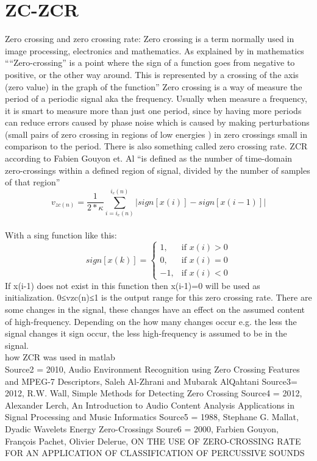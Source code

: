 \section{ZC-ZCR}

Zero crossing and zero crossing rate:
Zero crossing is a term normally used in image processing, electronics and mathematics. As explained by \citep{AlZhrani2010}  in mathematics ““Zero-crossing” is a point where the sign of a function goes from negative to positive, or the other way around. This is represented by a crossing of the axis (zero value) in the graph of the function” \citep{AlZhrani2010}
Zero crossing is a way of measure the period of a periodic signal aka the frequency.\citep{RWW2012}  Usually when measure a frequency, it is smart to measure more than just one period, since by having more periods can reduce errors caused by phase noise which is caused by making perturbations (small pairs of zero crossing in regions of low energies \citep{Mallat1988} ) in zero crossings small in comparison to the period. \citep{RWW2012}
There is also something called zero crossing rate. ZCR according to Fabien Gouyon et. Al “is defined as the number of time-domain zero-crossings within a defined region of signal, divided by the number of samples of that region” \citep{Gouyon2000}
\\
\begin{equation}\label{eq:ZCR}
v_{zc(n)}= \frac{1}{2* \kappa}\sum_{i=i_e(n)}^{i_e (n)}|sign[x(i)]-sign[x(i-1)]|
\end{equation}
\\
With a sing function like this:
\begin{equation}
sign[x(k)]=
\begin{cases}
 1, & \text{if } x(i)>0\\ 
 0, & \text{if } x(i)=0\\
-1, & \text{if } x(i)<0
\end{cases}
\end{equation}
If x(i-1) does not exist in this function then x(i-1)=0 will be used as initialization. 
0≤vzc(n)≤1 is the output range for this zero crossing rate. There are some changes in the signal, these changes have an effect on the assumed content of high-frequency. Depending on the how many changes occur e.g. the less the signal changes it sign occur, the less high-frequency is assumed to be in the signal. \citep{AlZhrani2010} 
\\
how ZCR was used in matlab
\\
Source2 = 2010, Audio Environment Recognition using Zero Crossing Features and MPEG-7 Descriptors, Saleh Al-Zhrani and Mubarak AlQahtani
Source3= 2012, R.W. Wall, Simple Methods for Detecting Zero Crossing 
Source4 = 2012, Alexander Lerch, An Introduction to Audio Content Analysis Applications in Signal Processing and Music Informatics
Source5 = 1988, Stephane G. Mallat, Dyadic Wavelets Energy Zero-Crossings
Soure6 = 2000, Farbien Gouyon, François Pachet, Olivier Delerue, ON THE USE OF ZERO-CROSSING RATE FOR AN APPLICATION OF CLASSIFICATION OF PERCUSSIVE SOUNDS  